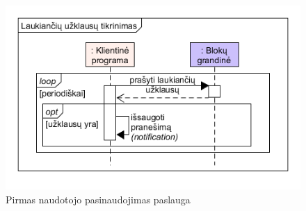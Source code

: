 \begin{figure}[h]
    \centering
    \includegraphics[scale=0.6]{img/checkForPendingPermissions}
    \caption{Pirmas naudotojo pasinaudojimas paslauga}
    \label{fig:checkForPendingPermissions}
\end{figure}